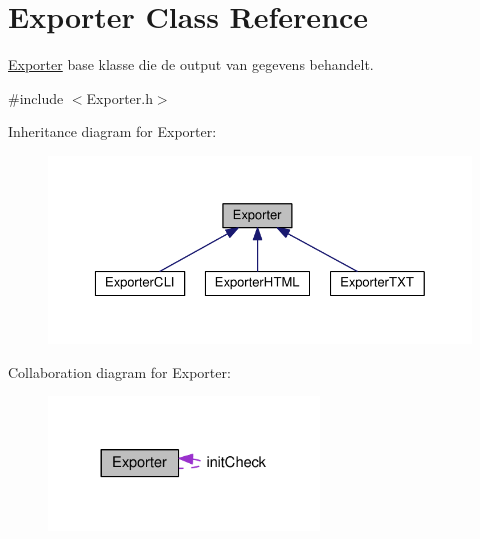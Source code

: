 \hypertarget{class_exporter}{}\section{Exporter Class Reference}
\label{class_exporter}


\hyperlink{class_exporter}{Exporter} base klasse die de output van gegevens behandelt.  




{\ttfamily \#include $<$Exporter.\+h$>$}



Inheritance diagram for Exporter\+:
\nopagebreak
\begin{figure}[H]
\begin{center}
\leavevmode
\includegraphics[width=350pt]{class_exporter__inherit__graph}
\end{center}
\end{figure}


Collaboration diagram for Exporter\+:
\nopagebreak
\begin{figure}[H]
\begin{center}
\leavevmode
\includegraphics[width=204pt]{class_exporter__coll__graph}
\end{center}
\end{figure}
